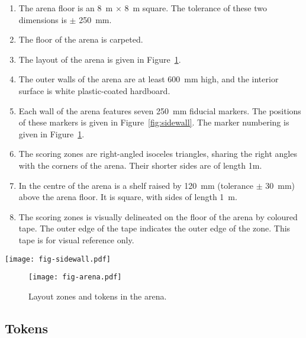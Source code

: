 \begin{enumerate}
  \item The arena floor is an \SI{8}{m} $\times$ \SI{8}{m} square. The tolerance
        of these two dimensions is $\pm$ \SI{250}{mm}.
  \item The floor of the arena is carpeted.
  \item The layout of the arena is given in Figure~\ref{fig:arena}.
  \item The outer walls of the arena are at least \SI{600}{mm} high, and the
        interior surface is white plastic-coated hardboard.
  \item Each wall of the arena features seven \SI{250}{mm} fiducial markers.
        The positions of these markers is given in Figure~\ref{fig:sidewall}.
        The marker numbering is given in Figure~\ref{fig:arena}.
  \item The scoring zones are right-angled isoceles triangles, sharing
        the right angles with the corners of the arena. Their shorter sides are
        of length \si{1}{m}.
  \item In the centre of the arena is a shelf raised by \SI{120}{mm}
        (tolerance $\pm$ \SI{30}{mm}) above the arena floor. It is square,
        with sides of length \SI{1}{m}.
  \item The scoring zones is visually delineated on the floor of
        the arena by coloured tape. The outer edge of the tape indicates the
        outer edge of the zone. This tape is for visual reference only.
\end{enumerate}

\begin{sidewaysfigure}
  \texttt{[image: fig-sidewall.pdf]}
  \caption{Layout of markers along each arena wall.}
  \label{fig:sidewall}
\end{sidewaysfigure}

\begin{figure}
  \texttt{[image: fig-arena.pdf]}
  \caption{Layout zones and tokens in the arena.}
  \label{fig:arena}
\end{figure}

\subsection{Tokens}
\label{spec:tokens}

